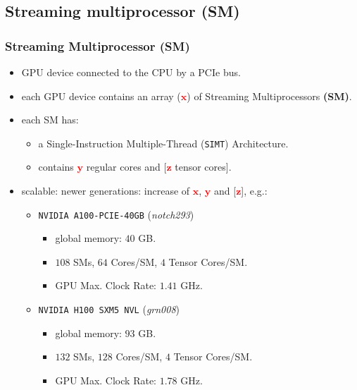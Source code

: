 \subsection{Streaming multiprocessor (SM)}
\begin{frame}
\frametitle{Streaming Multiprocessor (SM)}
\begin{itemize}
\item GPU device connected to the CPU by a PCIe bus. 
\item each GPU device contains an array (\textcolor{red}{$\mathbf{x}$}) of Streaming Multiprocessors \textbf{(SM)}.
\item each SM has:
\begin{itemize}
   \item a Single-Instruction Multiple-Thread (\texttt{SIMT}) Architecture.
   \item contains \textcolor{red}{$\mathbf{y}$} regular cores and [\textcolor{red}{$\mathbf{z}$} tensor cores].
\end{itemize} 
\item scalable: newer generations: increase of \textcolor{red}{$\mathbf{x}$}, \textcolor{red}{$\mathbf{y}$} 
	and [\textcolor{red}{$\mathbf{z}$}], e.g.:
   \begin{itemize}
	   \item \texttt{NVIDIA A100-PCIE-40GB} (\textit{notch293})
         \begin{itemize}
            \item global memory: $40$ GB.			 
            \item $108$ SMs, $64$ Cores/SM, $4$ Tensor Cores/SM.
            \item GPU Max. Clock Rate: $1.41$ GHz.
         \end{itemize}		   
 \item \texttt{NVIDIA H100 SXM5 NVL} (\textit{grn008})	
         \begin{itemize}
            \item global memory: $93$ GB.			 
            \item $132$ SMs, $128$ Cores/SM, $4$ Tensor Cores/SM.
	    \item GPU Max. Clock Rate: $1.78$ GHz. 
         \end{itemize}
   \end{itemize}		   
\end{itemize}
\end{frame} 

